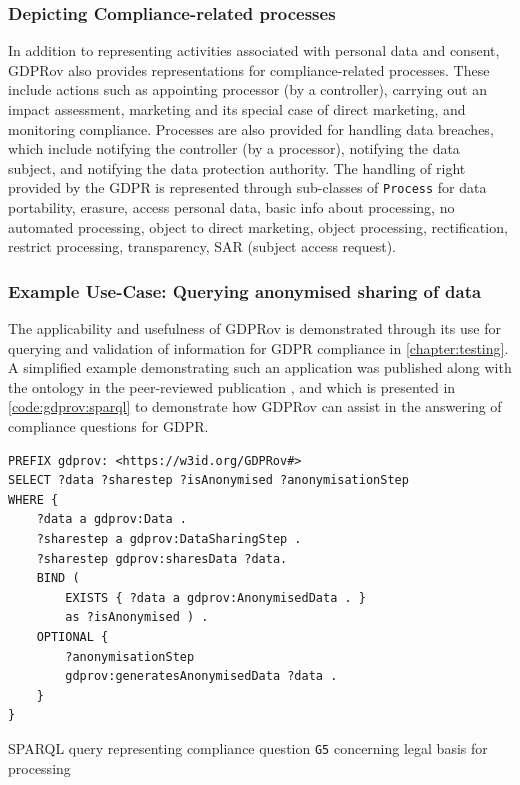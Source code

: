 \subsubsection{Depicting Compliance-related processes}
In addition to representing activities associated with personal data and consent, GDPRov also provides representations for compliance-related processes.
These include actions such as appointing processor (by a controller), carrying out an impact assessment, marketing and its special case of direct marketing, and monitoring compliance.
Processes are also provided for handling data breaches, which include notifying the controller (by a processor), notifying the data subject, and notifying the data protection authority.
The handling of right provided by the GDPR is represented through sub-classes of \texttt{Process} for data portability, erasure, access personal data, basic info about processing, no automated processing, object to direct marketing, object processing, rectification, restrict processing, transparency, SAR (subject access request).



\subsubsection{Example Use-Case: Querying anonymised sharing of data}
The applicability and usefulness of GDPRov is demonstrated through its use for querying and validation of information for GDPR compliance in \autoref{chapter:testing}.
A simplified example demonstrating such an application was published along with the ontology in the peer-reviewed publication \cite{pandit_modelling_2017}, and which is presented in \autoref{code:gdprov:sparql} to demonstrate how GDPRov can assist in the answering of compliance questions for GDPR.
\begin{listing}[htbp]
\begin{verbatim}
PREFIX gdprov: <https://w3id.org/GDPRov#>
SELECT ?data ?sharestep ?isAnonymised ?anonymisationStep
WHERE {
    ?data a gdprov:Data .
    ?sharestep a gdprov:DataSharingStep .
    ?sharestep gdprov:sharesData ?data. 
    BIND (
        EXISTS { ?data a gdprov:AnonymisedData . }
        as ?isAnonymised ) .
    OPTIONAL {
        ?anonymisationStep
        gdprov:generatesAnonymisedData ?data .
    }
}
\end{verbatim}
\caption{SPARQL query representing compliance question \texttt{G5} concerning legal basis for processing}
\label{code:gdprov:sparql}
\end{listing}


